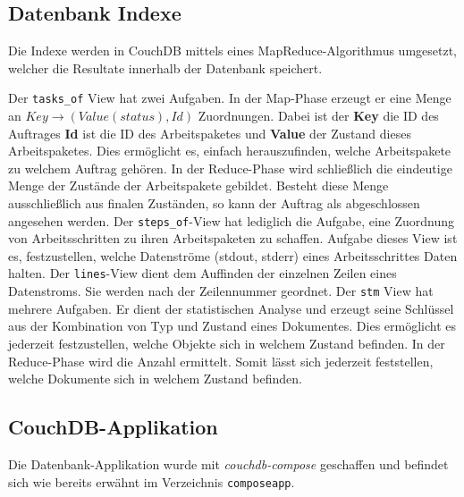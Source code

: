 \subsection{Datenbank Indexe}
\label{sec:db-indexe}

Die Indexe werden in CouchDB mittels 
eines MapReduce-Algorithmus \cite{couchdb:views} umgesetzt,
welcher die Resultate innerhalb der Datenbank speichert.

\begin{description}
    \dhitem[tasks\_of]
        Der \verb|tasks_of| View hat zwei Aufgaben.
        In der Map-Phase erzeugt er eine Menge an \hbox{$Key \rightarrow (Value(status), Id)$} Zuordnungen.
        Dabei ist der \textbf{Key} die ID des Auftrages
        \textbf{Id} ist die ID des Arbeitspaketes
        und \textbf{Value} der Zustand dieses Arbeitspaketes.
        Dies ermöglicht es, einfach herauszufinden,
        welche Arbeitspakete zu welchem Auftrag gehören.
        In der Reduce-Phase wird schließlich die eindeutige Menge
        der Zustände der Arbeitspakete gebildet.
        Besteht diese Menge ausschließlich aus finalen Zuständen,
        so kann der Auftrag als abgeschlossen angesehen werden.
    \dhitem[steps\_of]
        Der \verb|steps_of|-View hat lediglich die Aufgabe,
        eine Zuordnung von Arbeitsschritten
        zu ihren Arbeitspaketen zu schaffen.
    \dhitem[streams]
        Aufgabe dieses View ist es,
        festzustellen, welche Datenströme (stdout, stderr)
        eines Arbeitsschrittes Daten halten.
    \dhitem[lines]
        Der \verb|lines|-View dient dem Auffinden der einzelnen Zeilen
        eines Datenstroms. Sie werden nach der Zeilennummer geordnet.
    \dhitem[stm]
        Der \verb|stm| View hat mehrere Aufgaben.
        Er dient der statistischen Analyse und
        erzeugt seine Schlüssel aus der Kombination
        von Typ und Zustand eines Dokumentes.
        Dies ermöglicht es jederzeit festzustellen,
        welche Objekte sich in welchem Zustand befinden.
        In der Reduce-Phase wird die Anzahl ermittelt.
        Somit lässt sich jederzeit feststellen,
        welche Dokumente sich in welchem Zustand befinden.
\end{description}

\subsection{CouchDB-Applikation}

Die Datenbank-Applikation wurde mit \emph{couchdb-compose} \cite{couchdb:compose} geschaffen und befindet sich wie bereits erwähnt im Verzeichnis \verb|composeapp|.

